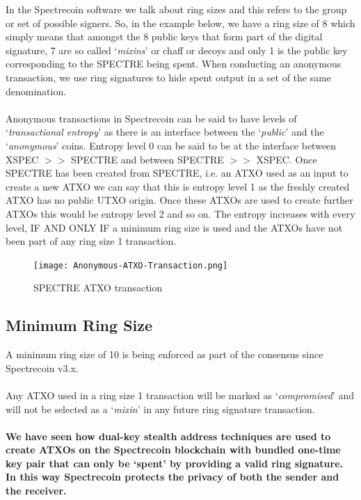 In the Spectrecoin software we talk about ring sizes and this refers to the
group or set of possible signers. So, in the example below, we have a ring
size of 8 which simply means that amongst the 8 public keys that form part
of the digital signature, 7 are so called ‘\textit{mixins}’ or chaff or decoys and
only 1 is the public key corresponding to the SPECTRE being spent. When
conducting an anonymous transaction, we use ring signatures to hide spent
output in a set of the same denomination.
\\
\\
\noindent
Anonymous transactions in Spectrecoin can be said to have levels of
‘\textit{transactional entropy}’ as there is an interface between the ‘\textit{public}’
and the ‘\textit{anonymous}’ coins. Entropy level 0 can be said to be at the
interface between XSPEC $>>$ SPECTRE and between SPECTRE $>>$ XSPEC. Once
SPECTRE has been created from SPECTRE, i.e. an ATXO used as an input to
create a new ATXO we can say that this is entropy level 1 as the freshly
created ATXO has no public UTXO origin. Once these ATXOs are used to
create further ATXOs this would be entropy level 2 and so on. The entropy
increases with every level, IF AND ONLY IF a minimum ring size is used and
the ATXOs have not been part of any ring size 1 transaction.
\newpage

\begin{figure}[ht]
	\centering
	\texttt{[image: Anonymous-ATXO-Transaction.png]}
	\caption{SPECTRE ATXO transaction}
\end{figure}




\subsection{Minimum Ring Size}

A minimum ring size of 10 is being enforced as part of the consensus since 
Spectrecoin v3.x.
\\
\\
\noindent
Any ATXO used in a ring size 1 transaction will be marked as 
‘\textit{compromised}’ and will not be selected as a ‘\textit{mixin}’ 
in any future ring signature transaction.
\\
\\
\noindent
\textbf{We have seen how dual-key stealth address techniques are used to 
create ATXOs on the Spectrecoin blockchain with bundled one-time key pair 
that can only be ‘spent’ by providing a valid ring signature. In this way 
Spectrecoin protects the privacy of both the sender and the receiver.}




